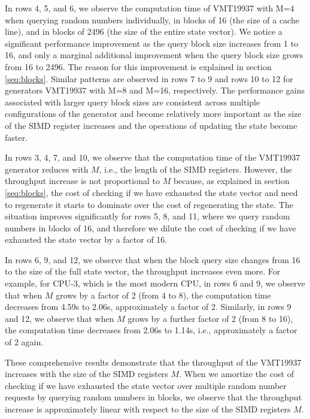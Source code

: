 \documentclass[preprint,1p,times]{elsarticle}
\begin{document}
\noindent In rows 4, 5, and 6, we observe the computation time of VMT19937 with M=4 when querying random numbers individually, in blocks of 16 (the size of a cache line), and in blocks of 2496 (the size of the entire state vector). We notice a significant performance improvement as the query block size increases from 1 to 16, and only a marginal additional improvement when the query block size grows from 16 to 2496. The reason for this improvement is explained in section \ref{seq:blocks}. Similar patterns are observed in rows 7 to 9 and rows 10 to 12 for generators VMT19937 with M=8 and M=16, respectively. The performance gains associated with larger query block sizes are consistent across multiple configurations of the generator and become relatively more important as the size of the SIMD register increases and the operations of updating the state become faster.

\noindent In rows 3, 4, 7, and 10, we observe that the computation time of the VMT19937 generator reduces with $M$, i.e., the length of the SIMD registers. However, the throughput increase is not proportional to $M$ because, as explained in section \ref{seq:blocks}, the cost of checking if we have exhausted the state vector and need to regenerate it starts to dominate over the cost of regenerating the state. The situation improves significantly for rows 5, 8, and 11, where we query random numbers in blocks of 16, and therefore we dilute the cost of checking if we have exhausted the state vector by a factor of 16.

\noindent In rows 6, 9, and 12, we observe that when the block query size changes from 16 to the size of the full state vector, the throughput increases even more. For example, for CPU-3, which is the most modern CPU, in rows 6 and 9, we observe that when $M$ grows by a factor of 2 (from 4 to 8), the computation time decreases from 4.59s to 2.06s, approximately a factor of 2. Similarly, in rows 9 and 12, we observe that when $M$ grows by a further factor of 2 (from 8 to 16), the computation time decreases from 2.06s to 1.14s, i.e., approximately a factor of 2 again.

\noindent These comprehensive results demonstrate that the throughput of the VMT19937 increases with the size of the SIMD registers $M$. When we amortize the cost of checking if we have exhausted the state vector over multiple random number requests by querying random numbers in blocks, we observe that the throughput increase is approximately linear with respect to the size of the SIMD registers $M$.
\end{document}
